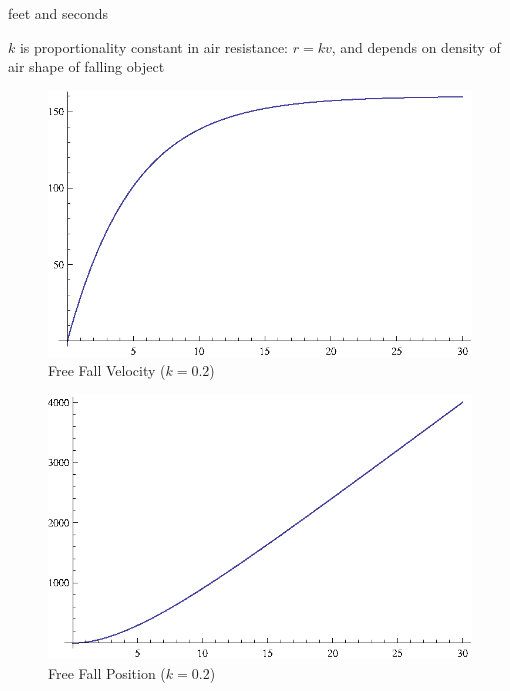 \documentclass{exam}
\begin{document}
  \begin{itemize*}
    \item feet and seconds
    \item $k$ is proportionality constant in air resistance: $r = kv$, and depends on density of air shape of falling object
  \end{itemize*}

  \begin{figure}[h]
    \centering
    \includegraphics[scale=0.9]{freeFallVelocity.eps}
    \caption{Free Fall Velocity ($k = 0.2$)}
  \end{figure}

  \begin{figure}[h]
    \centering
    \includegraphics[scale=0.9]{freeFallPosition.eps}
    \caption{Free Fall Position ($k = 0.2$)}
  \end{figure}
\end{document}
